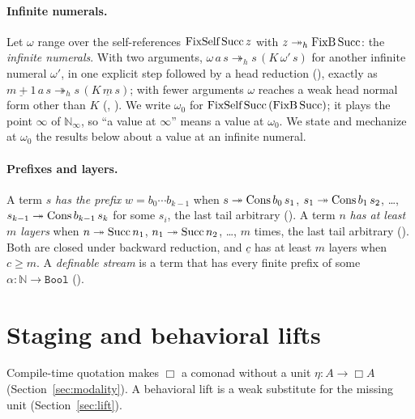 \documentclass[acmsmall,review,screen]{acmart}\def\acmclass{}
\theoremstyle{plain}
\theoremstyle{definition}
\theoremstyle{remark}
\newcommand{\red}{\twoheadrightarrow}
\newcommand{\hred}{\twoheadrightarrow_{h}}
\newcommand{\fn}[1]{\textup{#1}}  %
\newcommand{\num}[1]{\underline{#1}}
\newcommand{\Bool}{\mathtt{Bool}}
\begin{document}
\paragraph{Infinite numerals.}  Let $\omega$ range over the self-references
$\fn{FixSelf}\,\fn{Succ}\,z$ with $z \hred \fn{FixB}\,\fn{Succ}$:
the \emph{infinite numerals}.  With two arguments,
$\omega\,a\,s \hred s\,(K\,\omega'\,s)$ for another infinite numeral $\omega'$, in
one explicit step followed by a head reduction (), exactly as
$\num{m+1}\,a\,s\hred s\,(K\,\num{m}\,s)$; with fewer arguments $\omega$ reaches a
weak head normal form other than $K$ (, ).
We write $\omega_0$ for $\fn{FixSelf}\,\fn{Succ}\,(\fn{FixB}\,\fn{Succ})$; it plays the
point $\infty$ of $\mathbb{N}_\infty$, so ``a value at $\infty$'' means a value at
$\omega_0$.  We state and mechanize at $\omega_0$ the results below about a value at an
infinite numeral.

\paragraph{Prefixes and layers.}  A term $s$ \emph{has the prefix}
$w = b_0\cdots b_{k-1}$ when $s \red \fn{Cons}\,b_0\,s_1$,
$s_1 \red \fn{Cons}\,b_1\,s_2$, \dots, $s_{k-1}\red \fn{Cons}\,b_{k-1}\,s_k$
for some $s_i$, the last tail arbitrary ().  A term $n$ \emph{has at
least $m$ layers} when $n \red \fn{Succ}\,n_1$, $n_1\red\fn{Succ}\,n_2$,
\dots, $m$ times, the last tail arbitrary ().  Both are closed under
backward reduction, and $\num{c}$ has at least $m$ layers when $c \ge m$.  A
\emph{definable stream} is a term that has every finite prefix of some
$\alpha:\mathbb{N}\to\Bool$ ().

\section{Staging and behavioral lifts}\label{sec:staging}
Compile-time quotation makes $\Box$ a comonad without a unit $\eta : A\to\Box A$
(Section~\ref{sec:modality}).
A behavioral lift is a weak substitute for the missing unit (Section~\ref{sec:lift}).
\end{document}

